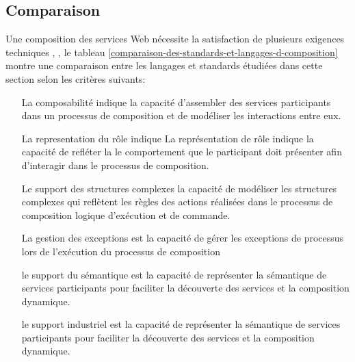     \subsection{Comparaison}
    \label{sec:langs-comparaison}   
    Une composition des services Web nécessite la satisfaction de
    plusieurs exigences techniques \cite{sheng2014web},
    \cite{bucchiarone2006survey}, le tableau
    \ref{comparaison-des-standards-et-langages-d-composition} montre
    une comparaison entre les langages et standards étudiées dans
    cette section selon les critères suivants:
    
    \begin{itemize}
      \item [La composabilité] indique la capacité
        d'assembler des services participants dans un processus de
        composition et de modéliser les interactions entre eux.

      \item [La representation du rôle] indique La représentation de
        rôle indique la capacité de refléter la le comportement que le
        participant doit présenter afin d'interagir dans le processus
        de composition.

      \item [Le support des structures complexes] la capacité de
        modéliser les structures complexes qui reflètent les règles
        des actions réalisées dans le processus de composition logique
        d'exécution et de commande.

      \item [La gestion des exceptions] est la capacité de gérer les
        exceptions de processus lors de l'exécution du processus de
        composition

      \item [le support du sémantique] est la capacité de représenter
        la sémantique de services participants pour faciliter la
        découverte des services et la composition dynamique.

      \item [le support industriel] est la capacité de représenter
        la sémantique de services participants pour faciliter la
        découverte des services et la composition dynamique.
    \end{itemize}

